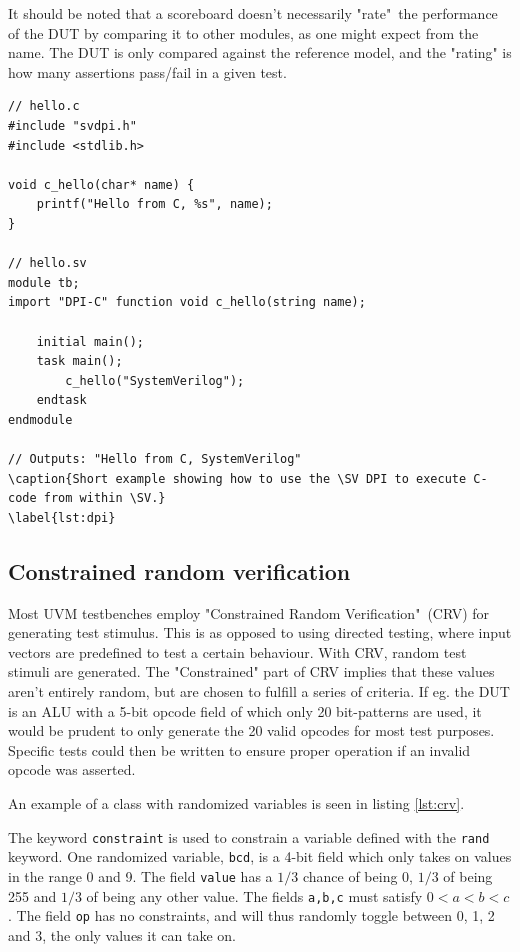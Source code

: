 \documentclass[conference]{IEEEtran}
\newcommand{\SV}{SystemVerilog\xspace}
\begin{document}
It should be noted that a scoreboard doesn't necessarily "rate"\, the performance of the DUT by comparing it to other modules, as one might expect from the name. The DUT is only compared against the reference model, and the "rating" is how many assertions pass/fail in a given test.

\begin{lstlisting}
// hello.c
#include "svdpi.h"
#include <stdlib.h>

void c_hello(char* name) {
	printf("Hello from C, %s", name);
}

// hello.sv
module tb;
import "DPI-C" function void c_hello(string name);

	initial main();
	task main();
		c_hello("SystemVerilog");
	endtask
endmodule

// Outputs: "Hello from C, SystemVerilog"
\caption{Short example showing how to use the \SV DPI to execute C-code from within \SV.}
\label{lst:dpi}
\end{lstlisting}

\subsection{Constrained random verification}

Most UVM testbenches employ "Constrained Random Verification"\, (CRV) for generating test stimulus. This is as opposed to using directed testing, where input vectors are predefined to test a certain behaviour. With CRV, random test stimuli are generated. The "Constrained" part of CRV implies that these values aren't entirely random, but are chosen to fulfill a series of criteria. If eg. the DUT is an ALU with a 5-bit opcode field of which only 20 bit-patterns are used, it would be prudent to only generate the 20 valid opcodes for most test purposes. Specific tests could then be written to ensure proper operation if an invalid opcode was asserted.

An example of a class with randomized variables is seen in listing \ref{lst:crv}. 

The keyword \texttt{constraint} is used to constrain a variable defined with the \texttt{rand} keyword.
One randomized variable, \texttt{bcd}, is a 4-bit field which only takes on values in the range 0 and 9. 
The field \texttt{value} has a $1/3$ chance of being 0, $1/3$ of being 255 and $1/3$ of being any other value. 
The fields \texttt{a,b,c} must satisfy $0<a<b<c$. 
The field \texttt{op} has no constraints, and will thus randomly toggle between  0, 1, 2 and 3, the only values it can take on.
\end{document}
